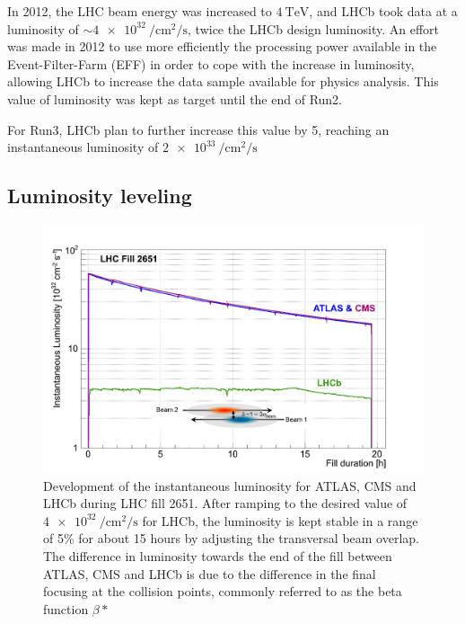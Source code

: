 In 2012, the LHC beam energy was increased to $\SI{4}{\tera\eV}$, and LHCb took data at a luminosity of $\sim \SI{4e32}{\per\centi\meter\squared\per\second}$, twice the LHCb design luminosity. An effort was made in 2012 to use more efficiently the processing power available in the Event-Filter-Farm (EFF) in order to cope with the increase in luminosity, allowing LHCb to increase the data sample available for physics analysis. This value of luminosity was kept as target until the end of Run2. 


For Run3, LHCb plan to further increase this value by 5, reaching an instantaneous luminosity of $\SI{2e33}{\per\centi\meter\squared\per\second}$

\subsection{Luminosity leveling}

\begin{figure}
    \centering
    \includegraphics[width=\textwidth]{figures/luminosity_leveling.png}
    \caption{Development of the instantaneous luminosity for ATLAS, CMS and LHCb during LHC fill 2651. After ramping to the desired value of $\SI{4e32}{\per\centi\meter\squared\per\second}$ for LHCb, the luminosity is kept stable in a range of 5\% for about 15 hours by adjusting the transversal beam overlap.
    The difference in luminosity towards the end of the fill between ATLAS, CMS and LHCb is due to the difference in the final focusing at the collision points, commonly referred to as the beta function $\beta*$}
    \label{fig:lumi-leveling}
\end{figure}

